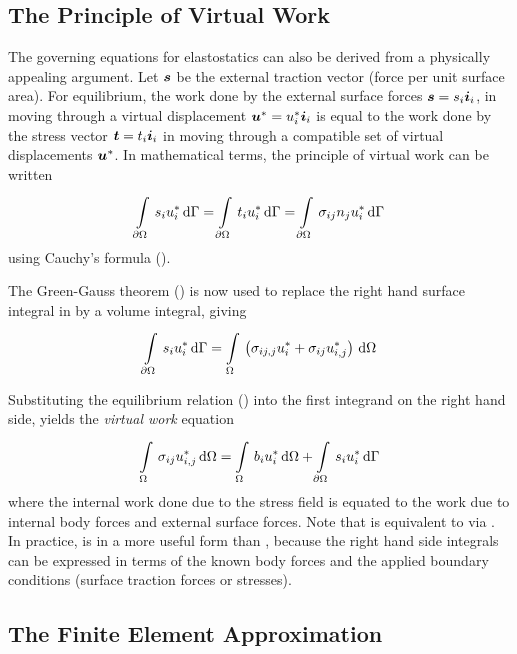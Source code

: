 \subsection{The Principle of Virtual Work}

The governing equations for elastostatics can also be derived from a
physically appealing argument. Let $ \boldsymbol{s} $ be the external traction vector
(\ie force per unit surface area).  For equilibrium, the work done by the
external surface forces $ \boldsymbol{s}  = s_{i} \boldsymbol{i} _{i}$, in moving through a
virtual displacement $ \boldsymbol{u} ^{*} = u_{i}^{*} \boldsymbol{i} _{i}$ is equal to the
work done by the stress vector $ \boldsymbol{t}  = t_{i} \boldsymbol{i} _{i}$ in moving
through a compatible set of virtual displacements $ \boldsymbol{u} ^{*}$. In
mathematical terms, the principle of virtual work can be written
\begin{equation}
  \gint{\del \Omega}{}{s_{i} u_{i}^{*}}{\Gamma} = \gint{\del \Omega}{}{t_{i} u_{i}^{*}}{\Gamma} 
  = \gint{\del \Omega}{}{\sigma_{ij}n_{j} u_{i}^{*}}{\Gamma}
  \label{eqn:virtwork1}
\end{equation}
using Cauchy's formula ().

The Green-Gauss theorem () is now used to replace the
right hand surface integral in  by a volume integral,
giving
\begin{equation}
  \gint{\del \Omega}{}{s_{i} u_{i}^{*}}{\Gamma} = \goneint{\pbrac{
  \sigma_{ij,j} u_{i}^{*} + \sigma_{ij} u_{i,j}^{*} }}{\Omega}
\end{equation}

Substituting the equilibrium relation () into the first
integrand on the right hand side, yields the \emph{virtual work} equation
\begin{equation}
  \goneint{\sigma_{ij} u_{i,j}^{*}}{\Omega} = \goneint{b_{i}
  u_{i}^{*}}{\Omega} + \gint{\del \Omega}{}{s_{i} u_{i}^{*}}{\Gamma}
  \label{eqn:virtwork2}
\end{equation}
where the internal work done due to the stress field is equated to the work
due to internal body forces and external surface forces.  Note that
 is equivalent to  via
. In practice,  is in a more
useful form than , because the right hand side integrals
can be expressed in terms of the known body forces and the applied boundary
conditions (surface traction forces or stresses).


\subsection{The Finite Element Approximation}

